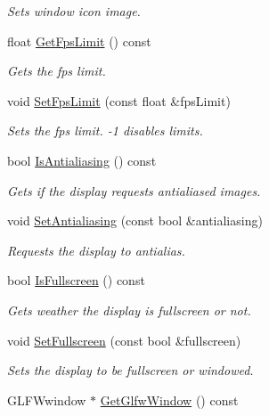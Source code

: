 \begin{DoxyCompactItemize}
\begin{DoxyCompactList}\small\item\em Sets window icon image. \end{DoxyCompactList}\item 
float \hyperlink{class_flounder_1_1_display_a29120d86c32475b76f9ecfc4039e0ed4}{Get\+Fps\+Limit} () const
\begin{DoxyCompactList}\small\item\em Gets the fps limit. \end{DoxyCompactList}\item 
void \hyperlink{class_flounder_1_1_display_ace043fe5dbae9942b3d95609e9f69805}{Set\+Fps\+Limit} (const float \&fps\+Limit)
\begin{DoxyCompactList}\small\item\em Sets the fps limit. -\/1 disables limits. \end{DoxyCompactList}\item 
bool \hyperlink{class_flounder_1_1_display_a844a9b3c9c2c862abf7abe5a5a1da767}{Is\+Antialiasing} () const
\begin{DoxyCompactList}\small\item\em Gets if the display requests antialiased images. \end{DoxyCompactList}\item 
void \hyperlink{class_flounder_1_1_display_a752c23c8de38e2e3b95cd8485d417955}{Set\+Antialiasing} (const bool \&antialiasing)
\begin{DoxyCompactList}\small\item\em Requests the display to antialias. \end{DoxyCompactList}\item 
bool \hyperlink{class_flounder_1_1_display_a58b67f3dc5531fc75846328e7c19bfa3}{Is\+Fullscreen} () const
\begin{DoxyCompactList}\small\item\em Gets weather the display is fullscreen or not. \end{DoxyCompactList}\item 
void \hyperlink{class_flounder_1_1_display_ade9b02cce9909ae589a79c5d915d2dd1}{Set\+Fullscreen} (const bool \&fullscreen)
\begin{DoxyCompactList}\small\item\em Sets the display to be fullscreen or windowed. \end{DoxyCompactList}\item 
G\+L\+F\+Wwindow $\ast$ \hyperlink{class_flounder_1_1_display_a67c84743b162ec66eba181a463e36d4b}{Get\+Glfw\+Window} () const

\end{DoxyCompactItemize}
